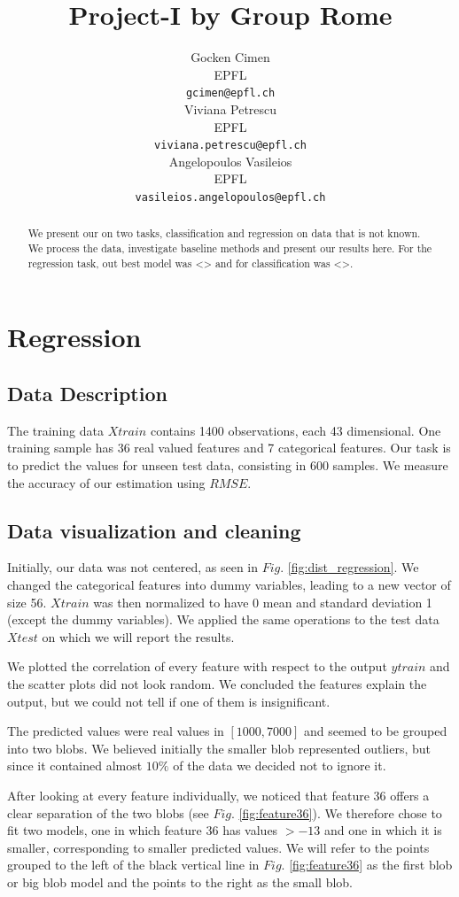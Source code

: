 \documentclass{article} %
\title{Project-I by Group Rome}
\author{
Gocken Cimen\\
EPFL \\
\texttt{gcimen@epfl.ch} \\
\And
Viviana Petrescu\\
EPFL \\
\texttt{viviana.petrescu@epfl.ch} \\
\And
Angelopoulos Vasileios \\
EPFL \\
\texttt{vasileios.angelopoulos@epfl.ch} \\
}
\begin{document}
\maketitle

\begin{abstract}
We present our on two tasks, classification and regression on data that is not known. We process the data, investigate baseline methods and present our results here.
For the regression task, out best model was <> and for classification was <>.
\end{abstract}

\section{Regression}
\subsection{Data Description}
The training data $Xtrain$ contains 1400 observations, each 43 dimensional. One training sample has 36 real valued features and 7 categorical features. Our task is to predict the values for unseen test data, consisting in 600 samples. We measure the accuracy of our estimation using $RMSE$. 

\subsection{Data visualization and cleaning}
Initially, our data was not centered, as seen in $Fig.$ \ref{fig:dist_regression}.
We changed the categorical features into dummy variables, leading to a new vector of size 56. $Xtrain$ was then normalized to have 0 mean and standard deviation 1 (except the dummy variables). We applied the same operations to the test data $Xtest$ on which we will report the results.

 We plotted the correlation of every feature with respect to the output $ytrain$ and the scatter plots did not look random. We concluded the features explain the output, but we could not tell if one of them is insignificant.

The predicted values were real values in $[1000,7000]$ and seemed to be grouped into two blobs. We believed initially the smaller blob represented outliers, but since it contained almost $10\%$ of the data we decided not to ignore it.

After looking at every feature individually, we noticed that feature 36 offers a clear separation of the two blobs (see $Fig.$ \ref{fig:feature36}). We therefore chose to fit two models, one in which feature 36 has values $>-13$ and one in which it is smaller, corresponding to smaller predicted values. We will refer to the points grouped to the left of the black vertical line in $Fig.$ \ref{fig:feature36} as the first blob or big blob model and the points to the right as the small blob.
\end{document}
